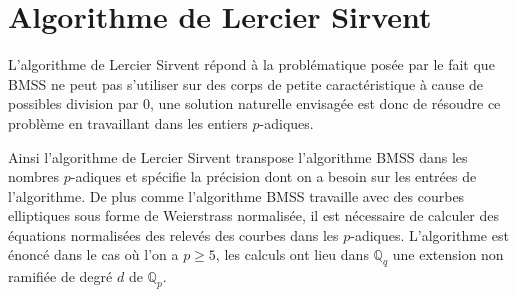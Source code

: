 \documentclass[10pt,a4paper]{book}
\theoremstyle{plain}
\theoremstyle{definition}
\theoremstyle{definition}
\theoremstyle{definition}
\theoremstyle{definition}
\theoremstyle{definition}
\theoremstyle{remark}
\theoremstyle{remark}
\theoremstyle{definition}
\begin{document}


\section{Algorithme de Lercier Sirvent}
L'algorithme de Lercier Sirvent répond à la problématique posée par le fait que BMSS ne peut pas s'utiliser sur des corps de petite caractéristique à cause de possibles division par $0$, une solution naturelle envisagée est donc de résoudre ce problème en travaillant dans les entiers $p$-adiques.

Ainsi l'algorithme de Lercier Sirvent transpose l'algorithme BMSS dans les 
nombres $p$-adiques et spécifie la précision dont on a besoin sur les entrées 
de l'algorithme. De plus comme l'algorithme  BMSS travaille avec des courbes 
elliptiques sous forme de Weierstrass normalisée, il est nécessaire de calculer
des équations normalisées des relevés des courbes dans les $p$-adiques. 
L'algorithme est énoncé dans le cas où l'on a $p \geqslant 5$, les calculs ont 
lieu dans $\mathbb{Q}_q$ une extension non ramifiée de degré $d$ de $\mathbb{Q}_p$.
\end{document}
